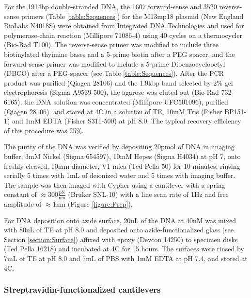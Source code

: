 \documentclass[%
  aip,12pt,tightenlines,
  amsthm,
 amsmath,amssymb
]{article}
\newcommand{\tRef}[1]{Table \ref{table:#1}}
\newcommand{\fRef}[1]{Figure \ref{figure:#1}}
\newcommand{\sRef}[1]{Section \ref{section:#1}}
\newcommand{\sLabel}[1]{\label{section:#1}}
\newcommand{\firstp}[0]{}
\newcommand{\pl}[0]{\vspace{6pt}}
\newcommand{\supply}[2]{(#1 #2)}
\newcommand{\degreeC}[0]{\degree{}C}
\begin{document}
\firstp For the 1914bp double-stranded DNA, the 1607 forward-sense and 3520 reverse-sense primers (\tRef{Sequences}) for the M13mp18 plasmid \supply{New England BioLabs}{N4018S} were obtained from Integrated DNA Technologies  and used for polymerase-chain reaction \supply{Millipore}{71086-4} using 40 cycles on a thermocycler \supply{Bio-Rad}{T100}. The reverse-sense primer was modified to include three biotinylated thyimine bases and a 5-prime biotin after a PEG spacer, and the forward-sense primer was modified to include a 5-prime Dibenzocyclooctyl (DBCO) after a PEG-spacer (see \tRef{Sequences}). After the PCR product was purified \supply{Qiagen}{28106} and the 1.9kbp band selected by 2\% gel electrophoresis \supply{Sigma}{A9539-500}, the agarose was eluted out \supply{Bio-Rad}{732-6165}, the DNA solution was concentrated \supply{Millipore}{UFC501096}, purified \supply{Qiagen}{28106}, and stored at 4\degreeC{} in a solution of TE, 10mM Tris \supply{Fisher}{BP151-1} and 1mM EDTA \supply{Fisher}{S311-500} at pH 8.0. The typical recovery efficiency of this procedure was 25\%. \pl

The purity of the DNA was verified by depositing 20pmol of DNA in imaging buffer, 3mM Nickel \supply{Sigma}{654597}, 10mM Hepes \supply{Sigma}{H4034} at pH 7, onto freshly-cleaved, 10mm diameter, V1 mica \supply{Ted Pella}{50} for 10 minutes, rinsing serially 5 times with 1mL of deionized water and 5 times with imaging buffer. The sample was then imaged with Cypher using a cantilever with a spring constant of $\approx 300 \frac{\text{pN}}{\text{nm}}$ \supply{Bruker}{SNL-10} with a line scan rate of 1Hz and free amplitude of $\approx$1nm (\fRef{Prep}).\pl 

For DNA deposition onto azide surface, 20uL of the DNA at 40nM was mixed with 80uL of TE at pH 8.0 and deposited onto azide-functionalized glass (see \sRef{Surface}) affixed with epoxy \supply{Devcon}{14250} to specimen disks \supply{Ted Pella}{16218} and incubated at 4C for 15 hours. The surfaces were rinsed by 7mL of TE at pH 8.0 and 7mL of PBS with 1mM EDTA at pH 7.4, and stored at 4\degreeC{}. 

\subsubsection{\sLabel{Cantilevers}Streptravidin-functionalized cantilevers}
\end{document}
